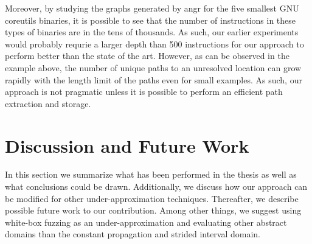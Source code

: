 \documentclass{kththesis}
\newcommand{\fbcomment}[1]{{#1}}
\renewcommand{\fbcomment}[1]{}
\begin{document}
Moreover, by studying the graphs generated by angr for the five smallest GNU coreutils binaries, it is possible to see that the number of instructions in these types of binaries are in the tens of thousands. As such, our earlier experiments would probably requrie a larger depth than 500 instructions for our approach to perform better than the state of the art. However, as can be observed in the example above, the number of unique paths to an unresolved location can grow rapidly with the length limit of the paths even for small examples. As such, our approach is not pragmatic unless it is possible to perform an efficient path extraction and storage.



\chapter{Discussion and Future Work}\label{chap:discussionAndConclusions}
\fbcomment{\color{red}Goal: Discuss the results and draw conclusions}
In this section we summarize what has been performed in the thesis as well as what conclusions could be drawn. Additionally, we discuss how our approach can be modified for other under-approximation techniques. Thereafter, we describe possible future work to our contribution. Among other things, we suggest using white-box fuzzing as an under-approximation and evaluating other abstract domains than the constant propagation and strided interval domain.
\end{document}
